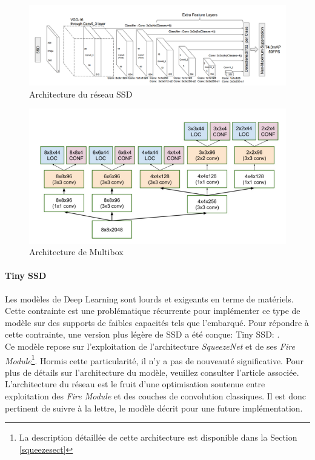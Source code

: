 \begin{figure}
\centering
\includegraphics[scale=0.4]{./tex/computer-vision/sota/ssdpic.png}
\caption{Architecture du réseau SSD}
\label{ssdnet}
\end{figure}

\begin{figure}
\centering
\includegraphics[scale=0.4]{./tex/computer-vision/sota/multibox.png}
\caption{Architecture de Multibox}
\label{multiboxnet}
\end{figure}

\paragraph{Tiny SSD}
Les modèles de Deep Learning sont lourds et exigeants en terme de matériels. Cette contrainte est une problématique récurrente pour implémenter ce type de modèle sur des supports de faibles capacités tels que l'embarqué. Pour répondre à cette contrainte, une version plus légère de SSD a été conçue: Tiny SSD: \cite{tinyssd}.\\

\noindent Ce modèle repose sur l'exploitation de l'architecture \textit{SqueezeNet} et de ses \textit{Fire Module}\footnote{La description détaillée de cette architecture est disponible dans la Section \ref{squeezesect}}. Hormis cette particularité, il n'y a pas de nouveauté significative. Pour plus de détails sur l'architecture du modèle, veuillez consulter l'article associée. L'architecture du réseau est le fruit d'une optimisation soutenue entre exploitation des \textit{Fire Module} et des couches de convolution classiques. Il est donc pertinent de suivre à la lettre, le modèle décrit pour une future implémentation.\\

